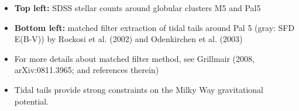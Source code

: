 \documentclass[letterpaper,landscape]{slides}
\begin{document}
\begin{slide}
{\begin{minipage}[t]{13cm}
\begin{itemize}
\item {\bf Top left:} SDSS stellar counts around globular clusters 
             M5 and Pal5 
\item {\bf Bottom left:} matched filter extraction of tidal tails around
         Pal 5 (gray: SFD E(B-V)) by Rockosi et al. (2002) and
         Odenkirchen et al. (2003)
\item For more details about matched filter method, see Grillmair (2008,
       arXiv:0811.3965; and references therein)
\item {\color{blue} Tidal tails provide strong constraints on the Milky 
       Way gravitational potential.} 
\end{itemize}

\end{minipage}}
\vfill 
\end{slide}





	
\end{document}
